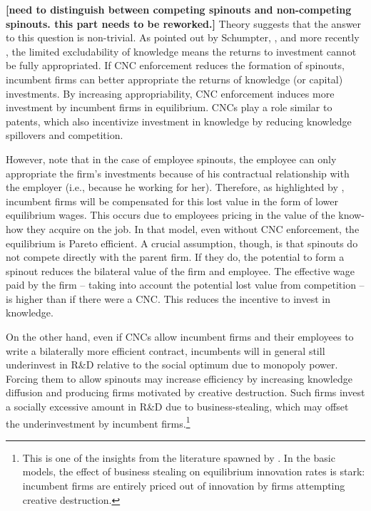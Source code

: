 \documentclass[12pt,english]{article}
\theoremstyle{remark}
\begin{document}
\textbf{[need to distinguish between competing spinouts and non-competing spinouts. this part needs to be reworked.]}
Theory suggests that the answer to this question is non-trivial. As pointed out by Schumpter, \cite{arrow_economic_1962}, and more recently \cite{romer_increasing_1986}, the limited excludability of knowledge means the returns to investment cannot be fully appropriated. If CNC enforcement reduces the formation of spinouts, incumbent firms can better appropriate the returns of knowledge (or capital) investments. By increasing appropriability, CNC enforcement induces more investment by incumbent firms in equilibrium. CNCs play a role similar to patents, which also incentivize investment in knowledge by reducing knowledge spillovers and competition.

However, note that in the case of employee spinouts, the employee can only appropriate the firm's investments because of his contractual relationship with the employer  (i.e., because he working for her).  Therefore, as highlighted by \cite{franco_spin-outs:_2006}, incumbent firms will be compensated for this lost value in the form of lower equilibrium wages. This occurs due to employees pricing in the value of the know-how they acquire on the job. In that model, even without CNC enforcement, the equilibrium is Pareto efficient. A crucial assumption, though, is that spinouts do not compete directly with the parent firm. If they do, the potential to form a spinout reduces the bilateral value of the firm and employee. The effective wage paid by the firm -- taking into account the potential lost value from competition -- is higher than if there were a CNC. This reduces the incentive to invest in knowledge. 

On the other hand, even if CNCs allow incumbent firms and their employees to write a bilaterally more efficient contract, incumbents will in general still underinvest in R\&D relative to the social optimum due to monopoly power. Forcing them to allow spinouts may increase efficiency by increasing knowledge diffusion and producing firms motivated by creative destruction. Such firms invest a socially excessive amount in R\&D due to business-stealing, which may offset the underinvestment by incumbent firms.\footnote{This is one of the insights from the literature spawned by \cite{grossman_quality_1991}. In the basic models, the effect of business stealing on equilibrium innovation rates is stark: incumbent firms are entirely priced out of innovation by firms attempting creative destruction.}
\end{document}
